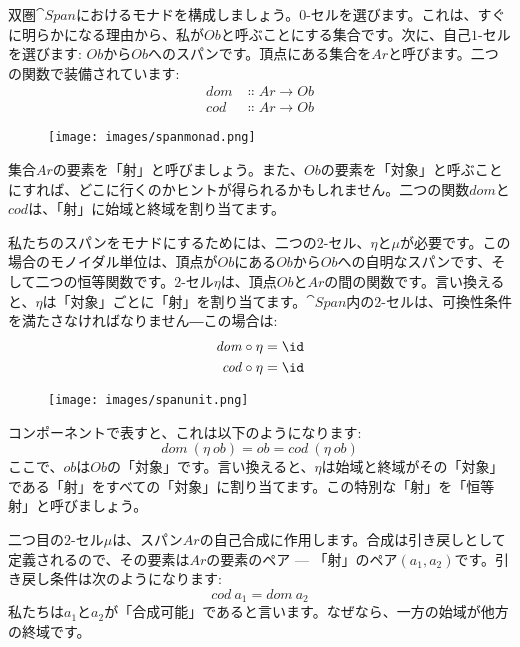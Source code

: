双圏$\cat{Span}$におけるモナドを構成しましょう。$0$-セルを選びます。これは、すぐに明らかになる理由から、私が$\mathit{Ob}$と呼ぶことにする集合です。次に、自己$1$-セルを選びます: $\mathit{Ob}$から$\mathit{Ob}$へのスパンです。頂点にある集合を$\mathit{Ar}$と呼びます。二つの関数で装備されています: 
\begin{align*}
  \mathit{dom} & \Colon \mathit{Ar} \to \mathit{Ob} \\
  \mathit{cod} & \Colon \mathit{Ar} \to \mathit{Ob}
\end{align*}

\begin{figure}[H]
  \centering
  \texttt{[image: images/spanmonad.png]}
\end{figure}

\noindent
集合$\mathit{Ar}$の要素を「射」と呼びましょう。また、$\mathit{Ob}$の要素を「対象」と呼ぶことにすれば、どこに行くのかヒントが得られるかもしれません。二つの関数$\mathit{dom}$と$\mathit{cod}$は、「射」に始域と終域を割り当てます。

私たちのスパンをモナドにするためには、二つの$2$-セル、$\eta$と$\mu$が必要です。この場合のモノイダル単位は、頂点が$\mathit{Ob}$にある$\mathit{Ob}$から$\mathit{Ob}$への自明なスパンです、そして二つの恒等関数です。$2$-セル$\eta$は、頂点$\mathit{Ob}$と$\mathit{Ar}$の間の関数です。言い換えると、$\eta$は「対象」ごとに「射」を割り当てます。$\cat{Span}$内の$2$-セルは、可換性条件を満たさなければなりません―この場合は: 
\begin{align*}
  \mathit{dom} & \circ \eta = \id \\
  \mathit{cod} & \circ \eta = \id
\end{align*}

\begin{figure}[H]
  \centering
  \texttt{[image: images/spanunit.png]}
\end{figure}

\noindent
コンポーネントで表すと、これは以下のようになります: 
\[\mathit{dom}\ (\eta\ \mathit{ob}) = \mathit{ob} = \mathit{cod}\ (\eta\ \mathit{ob})\]
ここで、$\mathit{ob}$は$\mathit{Ob}$の「対象」です。言い換えると、$\eta$は始域と終域がその「対象」である「射」をすべての「対象」に割り当てます。この特別な「射」を「恒等射」と呼びましょう。

二つ目の$2$-セル$\mu$は、スパン$\mathit{Ar}$の自己合成に作用します。合成は引き戻しとして定義されるので、その要素は$\mathit{Ar}$の要素のペア --- 「射」のペア$(a_1, a_2)$です。引き戻し条件は次のようになります: 
\[\mathit{cod}\ a_1 = \mathit{dom}\ a_2\]
私たちは$a_1$と$a_2$が「合成可能」であると言います。なぜなら、一方の始域が他方の終域です。

